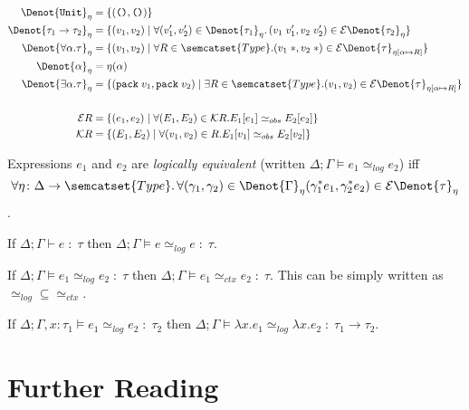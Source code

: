 \begin{alignat*}{2}
  \Denot{\texttt{Unit}}_{\eta} & = \{ (\texttt{()}, \texttt{()}) \} \\
  \Denot{\tau_1 \to \tau_2}_{\eta} & = \{ (v_1, v_2) \mid
    \forall (v_1', v_2') \in \Denot{\tau_1}_{\eta}\ldotp
    (v_1\;v_1', v_2\;v_2' ) \in \mathcal{E}\Denot{\tau_2}_{\eta} \} \\
  \Denot{\forall\alpha.\tau}_{\eta} & = \{ (v_1, v_2) \mid \forall R \in \semcatset{Type}.
    (v_1\;*, v_2\;*) \in \mathcal{E}\Denot{\tau}_{\eta[\alpha \mapsto R]} \} \\
  \Denot{\alpha}_{\eta} & = \eta(\alpha) \\
  \Denot{\exists\alpha.\tau}_{\eta} & =
    \{ (\texttt{pack}\;v_1,\texttt{pack}\;v_2) \mid \exists R \in \semcatset{Type}.
    (v_1, v_2) \in \mathcal{E}\Denot{\tau}_{\eta[\alpha \mapsto R]} \} \\\\
  \mathcal{E}R & = \{ (e_1, e_2) \mid \forall (E_1, E_2) \in \mathcal{K} R. E_1[e_1] \simeq_{obs}  E_2[e_2]\}\\
  \mathcal{K}R & = \{ (E_1, E_2) \mid \forall (v_1, v_2) \in R. E_1[v_1] \simeq_{obs}  E_2[v_2]\}\\
\end{alignat*}


\begin{defin}
  Expressions $e_1$ and $e_2$ are \emph{logically equivalent}
  (written $\Delta; \Gamma \models e_1 \simeq_{log} e_2$)
  iff
  \[
    \forall \eta \colon \Delta \to \semcatset{Type}\ldotp
    \forall (\gamma_1, \gamma_2) \in \Denot{\Gamma}_{\eta} \\
    (\gamma_1^*e_1, \gamma_2^*e_2) \in \mathcal{E}\Denot{\tau}_{\eta}
  \].
\end{defin}

\begin{theorem}
  If $\Delta; \Gamma \vdash e \;:\; \tau$ then $\Delta; \Gamma \models e \simeq_{log} e \;:\; \tau$.
\end{theorem}

\begin{theorem}[Soundness]
  If $\Delta; \Gamma \models e_1 \simeq_{log} e_2 \;:\; \tau$
  then $\Delta; \Gamma \models e_1 \simeq_{ctx} e_2 \;:\; \tau$.
  This can be simply written as $\simeq_{log} \subseteq \simeq_{ctx}$.
\end{theorem}

\begin{lemma}
  If $\Delta; \Gamma, x : \tau_1 \models e_1 \simeq_{log} e_2 \;:\; \tau_2$ then
  $\Delta; \Gamma \models \lambda x.e_1 \simeq_{log} \lambda x.e_2 \;:\; \tau_1 \to \tau_2$.
\end{lemma}


\section{Further Reading}
